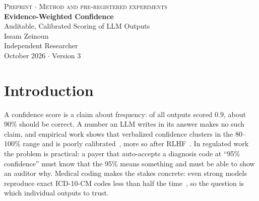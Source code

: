 \documentclass[10pt,letterpaper]{article}
\begin{document}
\thispagestyle{empty}
\begin{center}
{\color{gray}\textsc{Preprint $\cdot$ Method and pre-registered experiments}}\\[14pt]
{\LARGE\bfseries Evidence-Weighted Confidence}\\[4pt]
{\large Auditable, Calibrated Scoring of LLM Outputs}\\[14pt]
{\large Issam Zeinoun~}\\
{Independent Researcher}\\
{October 2026 $\cdot$ Version 3}
\end{center}
\vspace{6pt}

\begin{abstract}
\noindent Organizations that automate decisions with large language models (LLMs) face a basic problem: the confidence a model reports is not a probability. In our tests, when five current models said they were 93--99\% sure that a medical record supported a diagnosis code, they were right only 54--72\% of the time. Evidence-weighted confidence (EWC) fixes this by taking the judgment away from the model. The LLM only reads: it answers a short list of questions derived from the governing rules and quotes the text behind each answer. Code verifies the quotes, and a small logistic regression fitted on about 100 labeled cases turns the answers into a probability that comes with an audit trail.

In three pre-registered studies of ICD-10-CM coding on synthetic charts, ending with 200 held-out cases and five models, EWC's scores of 90\% or more were right 93--100\% of the time on every model, and EWC ranked cases far better than the models' own confidence (AUROC 0.90--1.00 against 0.59--0.77). It also let an inexpensive model match the best frontier result at about one fifteenth of the cost. The charts are synthetic; validation on real records is the next step.

\medskip\noindent\textbf{Keywords:} LLM evaluation; calibration; auditability; logistic regression; medical coding; risk adjustment.
\end{abstract}

\section{Introduction}

A confidence score is a claim about frequency: of all outputs scored 0.9, about 90\% should be correct. A number an LLM writes in its answer makes no such claim, and empirical work shows that verbalized confidence clusters in the 80--100\% range and is poorly calibrated~\cite{xiong}, more so after RLHF~\cite{leng}. In regulated work the problem is practical: a payer that auto-accepts a diagnosis code at ``95\% confidence'' must know that the 95\% means something and must be able to show an auditor why. Medical coding makes the stakes concrete: even strong models reproduce exact ICD-10-CM codes less than half the time~\cite{soroush}, so the question is which individual outputs to trust.
\end{document}

